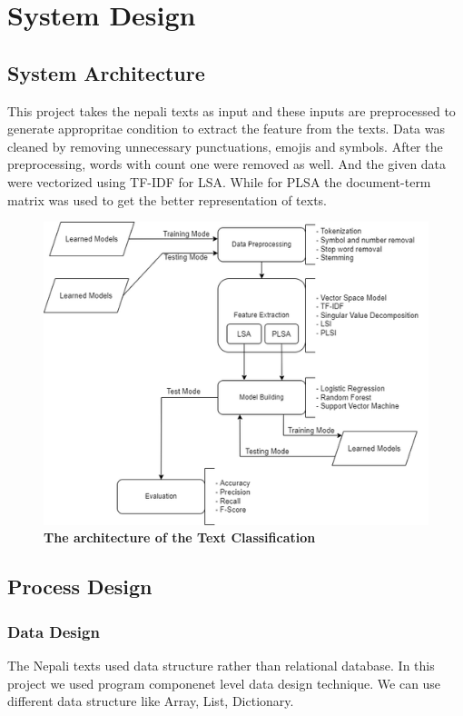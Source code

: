 \documentclass[12pt]{report}
\begin{document}
        \newpage
        \chapter{System Design}
        \section{System Architecture}
                This project takes the nepali texts as input and these inputs are preprocessed to generate appropritae condition to extract
                the feature from the texts.
                Data was cleaned by removing unnecessary punctuations, emojis and symbols. After the preprocessing, words with count one were removed as well. And the given data were vectorized using TF-IDF for LSA.
                While for PLSA the document-term matrix was used to get the better representation of texts.

                \begin{figure}[h!]
                        \centering
                        \includegraphics[scale=0.8]{system_architeture.png}
                        \caption{\textbf{The architecture of the Text Classification}}

                \end{figure}
        \section{Process Design}
        \subsection{Data Design}
        The Nepali texts used data structure rather than relational database. In this project we used program componenet level data design technique. We can use
        different data structure like Array, List, Dictionary.
\end{document}
